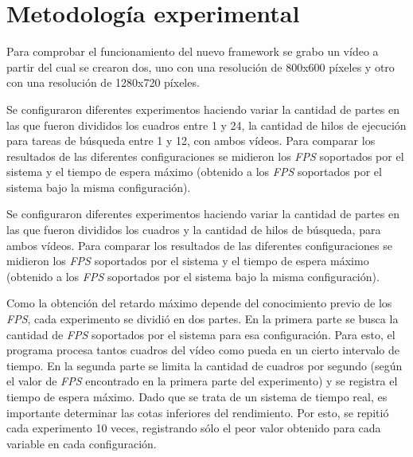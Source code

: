 
\section{Metodología experimental}

\label{metodologiaExperimental}

Para comprobar el funcionamiento del nuevo framework se grabo un vídeo a partir
del cual se crearon dos, uno con una resolución de 800x600 píxeles y otro con
una resolución de 1280x720 píxeles.

Se configuraron diferentes experimentos haciendo variar la cantidad de partes en
las que fueron divididos los cuadros entre 1 y 24, la cantidad de hilos de
ejecución para tareas de búsqueda entre 1 y 12, con ambos vídeos. Para comparar
los resultados de las diferentes configuraciones se midieron los \emph{FPS}
soportados por el sistema y el tiempo de espera máximo (obtenido a los
\emph{FPS} soportados por el sistema bajo la misma configuración).

Se configuraron diferentes experimentos haciendo variar la cantidad de partes en
las que fueron divididos los cuadros y la cantidad de hilos de búsqueda, para
ambos vídeos. Para comparar los resultados de las diferentes configuraciones se
midieron los \emph{FPS} soportados por el sistema y el tiempo de espera máximo
(obtenido a los \emph{FPS} soportados por el sistema bajo la misma
configuración).

Como la obtención del retardo máximo depende del conocimiento previo de los
\emph{FPS}, cada experimento se dividió en dos partes. En la primera parte se
busca la cantidad de \emph{FPS} soportados por el sistema para esa
configuración. Para esto, el programa procesa tantos cuadros del vídeo como
pueda en un cierto intervalo de tiempo. En la segunda parte se limita la
cantidad de cuadros por segundo (según el valor de \emph{FPS} encontrado en la
primera parte del experimento) y se registra el tiempo de espera máximo. Dado
que se trata de un sistema de tiempo real, es importante determinar las cotas
inferiores del rendimiento. Por esto, se repitió cada experimento 10 veces,
registrando sólo el peor valor obtenido para cada variable en cada
configuración.

